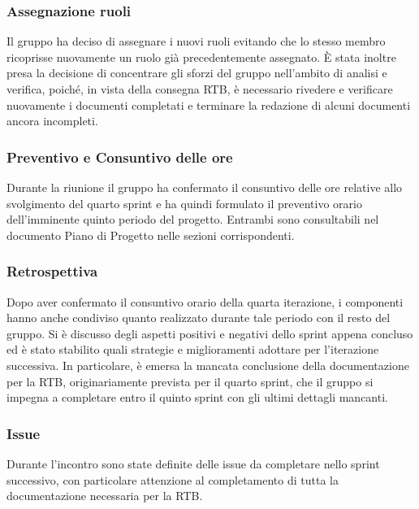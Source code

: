\documentclass[10pt]{article}
\begin{document}
\subsubsection{Assegnazione ruoli}
Il gruppo ha deciso di assegnare i nuovi ruoli evitando che lo stesso membro ricoprisse nuovamente un ruolo già precedentemente assegnato.
È stata inoltre presa la decisione di concentrare gli sforzi del gruppo nell'ambito di analisi e verifica, poiché, in vista della consegna RTB,
è necessario rivedere e verificare nuovamente i documenti completati e terminare la redazione di alcuni documenti ancora incompleti.

\subsubsection{Preventivo e Consuntivo delle ore}
Durante la riunione il gruppo ha confermato il consuntivo delle ore relative allo svolgimento del quarto sprint e ha quindi formulato il 
preventivo orario dell'imminente quinto periodo del progetto. Entrambi sono consultabili nel documento Piano di Progetto nelle sezioni
corrispondenti.

\subsubsection{Retrospettiva}
Dopo aver confermato il consuntivo orario della quarta iterazione, i componenti hanno anche condiviso quanto realizzato durante tale periodo
con il resto del gruppo. Si è discusso degli aspetti positivi e negativi dello sprint appena concluso ed è stato stabilito quali strategie e
miglioramenti adottare per l'iterazione successiva. In particolare, è emersa la mancata conclusione della documentazione per la RTB, 
originariamente prevista per il quarto sprint, che il gruppo si impegna a completare entro il quinto sprint con gli ultimi dettagli mancanti.

\subsubsection{Issue}
Durante l'incontro sono state definite delle issue da completare nello sprint successivo, con particolare attenzione al completamento
di tutta la documentazione necessaria per la RTB.
\end{document}
